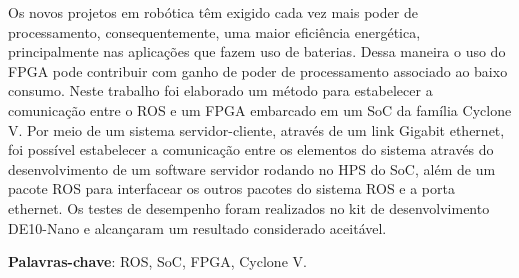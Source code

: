 
\setlength{\absparsep}{18pt} %
\begin{resumo}
    Os novos projetos em robótica têm exigido cada vez mais poder de processamento, consequentemente, uma maior eficiência energética, principalmente nas aplicações que fazem uso de baterias. Dessa maneira o uso do FPGA pode contribuir com ganho de poder de processamento associado ao baixo consumo. Neste trabalho foi elaborado um método para estabelecer a comunicação entre o ROS e um FPGA embarcado em um SoC da família Cyclone V. Por meio de um sistema servidor-cliente, através de um link Gigabit ethernet, foi possível estabelecer a comunicação entre os elementos do sistema através do desenvolvimento de um software servidor rodando no HPS do SoC, além de um pacote ROS para interfacear os outros pacotes do sistema ROS e a porta ethernet. Os testes de desempenho foram realizados no kit de desenvolvimento DE10-Nano e alcançaram um resultado considerado aceitável.

 \textbf{Palavras-chave}: ROS, SoC, FPGA, Cyclone V.
\end{resumo}
